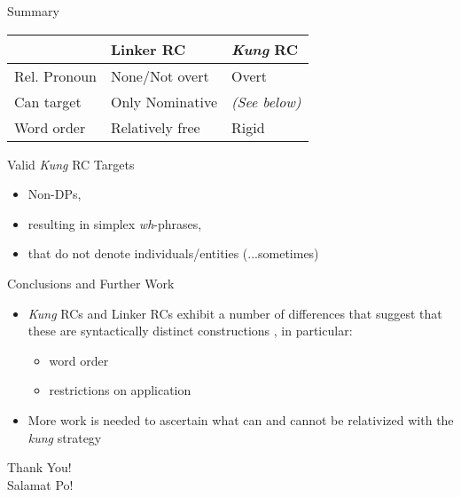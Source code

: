 \documentclass[pdf]{beamer}
\begin{document}
\begin{frame}{Summary}
  \begin{table}
    \begin{tabular}{lll}\toprule
                    & Linker RC         & \textit{Kung} RC \\\midrule
      Rel. Pronoun  & None/Not overt    & Overt \\
      Can target    & Only Nominative   & \textit{(See below)} \\
      Word order    & Relatively free   & Rigid \\
      \bottomrule
    \end{tabular}
  \end{table}

  \begin{block}{Valid \textit{Kung} RC Targets}
    \begin{itemize}
      \item Non-DPs,
      \item resulting in simplex \textit{wh}-phrases,
      \item that do not denote individuals/entities (...sometimes)
    \end{itemize}
  \end{block}
\end{frame}

\begin{frame}{Conclusions and Further Work}
  \begin{itemize}
    \item \textit{Kung} RCs and Linker RCs exhibit a number of differences that suggest that these are syntactically distinct constructions \citep[contra][]{otsuka2016}, in particular:
    \begin{itemize}
      \item word order
      \item restrictions on application
    \end{itemize}
    \item More work is needed to ascertain what can and cannot be relativized with the \textit{kung} strategy
  \end{itemize}
\end{frame}

\begin{frame}
  \centering\Huge
  Thank You!\\
  Salamat Po!\\

\end{frame}
\end{document}
